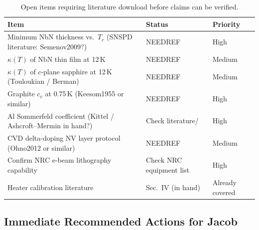 \begin{table}[ht]
\centering
\caption{Open items requiring literature download before claims can be verified.}
\label{tab:q7_open_items}
\small
\begin{tabular}{@{}p{5cm}p{3cm}p{2cm}@{}}
\toprule
Item & Status & Priority \\
\midrule
Minimum NbN thickness vs.\ $T_c$ (SNSPD literature: Semenov2009?)
  & NEEDREF & High \\
$\kappa(T)$ of NbN thin film at 12\,K
  & NEEDREF & Medium \\
$\kappa(T)$ of $c$-plane sapphire at 12\,K (Touloukian / Berman)
  & NEEDREF & Medium \\
Graphite $c_v$ at 0.75\,K (Keesom1955 or similar)
  & NEEDREF & High \\
Al Sommerfeld coefficient (Kittel / Ashcroft--Mermin in hand?)
  & Check literature/ & High \\
CVD delta-doping NV layer protocol (Ohno2012 or similar)
  & NEEDREF & Medium \\
Confirm NRC e-beam lithography capability
  & Check NRC equipment list & High \\
Heater calibration literature
  & \cite{Richards1994} Sec.~IV (in hand) & Already covered \\
\bottomrule
\end{tabular}
\end{table}

\subsection{Immediate Recommended Actions for Jacob}
\label{sec:q7_actions}

